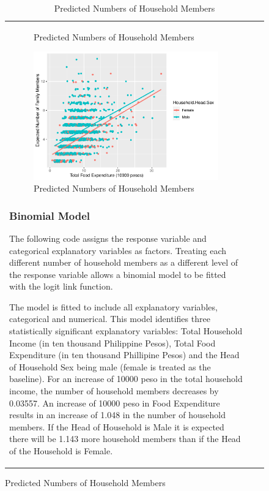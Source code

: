 \documentclass[
]{article}
\begin{document}
\begin{figure}[H]
\begin{table}[H]
\begin{tabular}[t]{lrr}
\begin{figure}[H]
{}

\caption{Predicted Numbers of Household Members}\label{fig:pred plot}
\end{figure}

\begin{figure}[H]

{\centering \includegraphics[width=0.8\linewidth]{Group_01_Project2_demo_files/figure-latex/compare plot-1} 

}

\caption{Predicted Numbers of Household Members}\label{fig:compare plot}
\end{figure}

\hypertarget{binomial-model}{%
\subsubsection{Binomial Model}\label{binomial-model}}

The following code assigns the response variable and categorical
explanatory variables as factors. Treating each different number of
household members as a different level of the response variable allows a
binomial model to be fitted with the logit link function.

The model is fitted to include all explanatory variables, categorical
and numerical. This model identifies three statistically significant
explanatory variables: Total Household Income (in ten thousand
Philippine Pesos), Total Food Expenditure (in ten thousand Phillipine
Pesos) and the Head of Household Sex being male (female is treated as
the baseline). For an increase of 10000 peso in the total household
income, the number of household members decreases by 0.03557. An
increase of 10000 peso in Food Expenditure results in an increase of
1.048 in the number of household members. If the Head of Household is
Male it is expected there will be 1.143 more household members than if
the Head of the Household is Female.


\end{tabular}
\end{table}
\end{figure}
\end{document}
